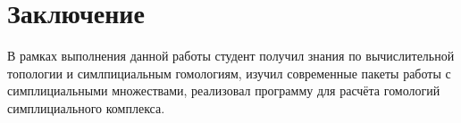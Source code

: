 \section{Заключение}
В рамках выполнения данной работы студент получил знания по вычислительной топологии и симлпициальным гомологиям, изучил современные пакеты работы с симплициальными множествами, реализовал программу для расчёта гомологий симплициального комплекса. 

